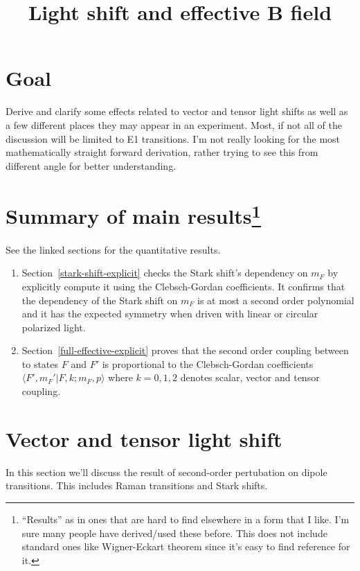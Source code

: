 \documentclass[10pt,fleqn]{article}
\title{Light shift and effective B field}
\begin{document}
\maketitle

\section{Goal}
Derive and clarify some effects related to vector and tensor light shifts
as well as a few different places they may appear in an experiment.
Most, if not all of the discussion will be limited to E1 transitions.
I'm not really looking for the most mathematically straight forward derivation,
rather trying to see this from different angle for better understanding.

\section[Summary of main results]{Summary of main results\protect\footnote{``Results'' as in ones that are hard to find elsewhere in a form that I like. I'm sure many people have derived/used these before. This does not include standard ones like Wigner-Eckart theorem since it's easy to find reference for it.}}

See the linked sections for the quantitative results.
\begin{enumerate}
\item Section~\ref{stark-shift-explicit} checks the Stark shift's dependency
  on $m_F$ by explicitly compute it using the Clebsch-Gordan coefficients.
  It confirms that {\color{blue}the dependency of the Stark shift on $m_F$
    is at most a second order polynomial} and it has the expected symmetry
  when driven with linear or circular polarized light.
\item Section~\ref{full-effective-explicit} proves that the second order coupling
  between to states $F$ and $F'$ is {\color{blue}proportional to
    the Clebsch-Gordan coefficients $\langle F',m_F'|F,k;m_F,p\rangle$}
  where $k=0,1,2$ denotes scalar, vector and tensor coupling.
\end{enumerate}

\section{Vector and tensor light shift}
In this section we'll discuss the result of second-order pertubation
on dipole transitions. This includes Raman transitions and Stark shifts.
\end{document}

